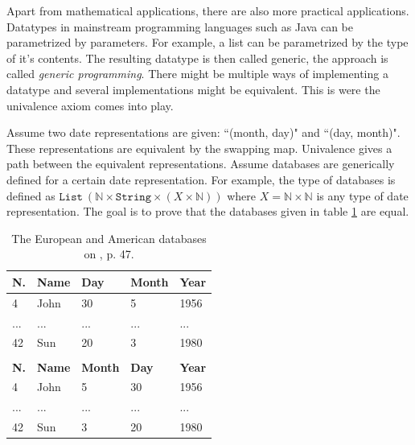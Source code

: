 \documentclass[12pt,a4paper,twoside,xetex]{book} %
\newcommand{\keyword}[1]{\emph{#1}\index{#1}}
\newcommand{\op}[1]{\mathtt{#1}}
\begin{document}
Apart from mathematical applications, there are also more practical 
applications. Datatypes in mainstream programming languages such as Java can be 
parametrized by parameters. For example, a list can be parametrized by the type 
of it's contents. The resulting datatype is then called generic, the approach 
is called \keyword{generic programming}. There might be multiple ways of 
implementing a datatype and several implementations might be equivalent. This 
is were the univalence axiom comes into play. 

Assume two date representations are given: ``(month, day)" and ``(day, 
month)". These representations are equivalent by the swapping map. Univalence 
gives a path between the equivalent representations. Assume databases are 
generically defined for a certain date representation. For example, the type of 
databases is defined as $\op{List} \ (\mathbb{N} \times \op{String} \times (X 
\times \mathbb{N}))$ where $X = \mathbb{N} \times \mathbb{N}$ is any type of 
date representation. The goal is to prove that the databases given in table 
\ref{databases} are equal.

\begin{table}[]
\centering
\begin{tabular}{lllll}
\hline
\textbf{N.} & \textbf{Name} & \textbf{Day} & \textbf{Month} & \textbf{Year} \\ 
\hline
4           & John          & 30           & 5              & 1956          \\
...  		& ...			& ...			& ...			& ...			\\
42          & Sun           & 20           & 3              & 1980          \\ 
\hline

\hline \\
\hline
\textbf{N.} & \textbf{Name} & \textbf{Month} & \textbf{Day} & \textbf{Year} \\ 
\hline
4           & John          & 5              & 30           & 1956          \\
...  		& ...			& ...			& ...			& ...			\\
42          & Sun           & 3              & 20           & 1980          \\ 
\hline
\end{tabular}
\caption{The European and American databases on \cite{Licata2013}, p. 47. 
\label{databases}}

\end{table}
\end{document}

